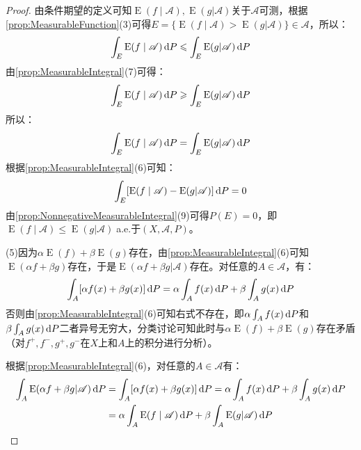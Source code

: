 \begin{proof}
	由条件期望的定义可知$\operatorname{E}(f\mid\mathscr{A}),\operatorname{E}(g|\mathscr{A})$关于$\mathscr{A}$可测，根据\cref{prop:MeasurableFunction}(3)可得$E=\{\operatorname{E}(f\mid\mathscr{A})>\operatorname{E}(g|\mathscr{A})\}\in\mathscr{A}$，所以：
	\begin{equation*}
		\int_{E}\operatorname{E}(f\mid\mathscr{A})\mathop{}\!\mathrm{d} P\leqslant\int_{E}\operatorname{E}(g|\mathscr{A})\mathop{}\!\mathrm{d} P
	\end{equation*}
	由\cref{prop:MeasurableIntegral}(7)可得：
	\begin{equation*}
		\int_{E}\operatorname{E}(f\mid\mathscr{A})\mathop{}\!\mathrm{d} P\geqslant\int_{E}\operatorname{E}(g|\mathscr{A})\mathop{}\!\mathrm{d} P
	\end{equation*}
	所以：
	\begin{equation*}
		\int_{E}\operatorname{E}(f\mid\mathscr{A})\mathop{}\!\mathrm{d} P=\int_{E}\operatorname{E}(g|\mathscr{A})\mathop{}\!\mathrm{d} P
	\end{equation*}
	根据\cref{prop:MeasurableIntegral}(6)可知：
	\begin{equation*}
		\int_{E}[\operatorname{E}(f\mid\mathscr{A})-\operatorname{E}(g|\mathscr{A})]\mathop{}\!\mathrm{d} P=0
	\end{equation*}
	由\cref{prop:NonnegativeMeasurableIntegral}(9)可得$P(E)=0$，即$\operatorname{E}(f\mid\mathscr{A})\leqslant\operatorname{E}(g|\mathscr{A})\;$a.e.于$(X,\mathscr{A},P)$。\par
	(5)因为$\alpha\operatorname{E}(f)+\beta\operatorname{E}(g)$存在，由\cref{prop:MeasurableIntegral}(6)可知$\operatorname{E}(\alpha f+\beta g)$存在，于是$\operatorname{E}(\alpha f+\beta g|\mathscr{A})$存在。对任意的$A\in\mathscr{A}$，有：
	\begin{equation*}
		\int_{A}[\alpha f(x)+\beta g(x)]\mathop{}\!\mathrm{d} P=\alpha\int_{A}f(x)\mathop{}\!\mathrm{d} P+\beta\int_{A}g(x)\mathop{}\!\mathrm{d} P
	\end{equation*}
	否则由\cref{prop:MeasurableIntegral}(6)可知右式不存在，即$\alpha\int_{A}f(x)\mathop{}\!\mathrm{d} P$和$\beta\int_{A}g(x)\mathop{}\!\mathrm{d} P$二者异号无穷大，分类讨论可知此时与$\alpha\operatorname{E}(f)+\beta\operatorname{E}(g)$存在矛盾（对$f^+,f^-,g^+,g^-$在$X$上和$A$上的积分进行分析）。\par
	根据\cref{prop:MeasurableIntegral}(6)，对任意的$A\in\mathscr{A}$有：
	\begin{align*}
		\int_{A}\operatorname{E}(\alpha f+\beta g|\mathscr{A})\dif P&=\int_{A}[\alpha f(x)+\beta g(x)]\dif P=\alpha\int_{A}f(x)\dif P+\beta\int_{A}g(x)\dif P \\
		&=\alpha\int_{A}\operatorname{E}(f\mid\mathscr{A})\dif P+\beta\int_{A}\operatorname{E}(g|\mathscr{A})\dif P \\

\end{align*}
\end{proof}
